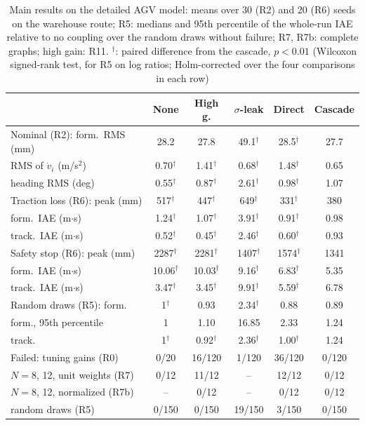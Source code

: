 \begin{table}[t]
\caption{Main results on the detailed AGV model: means over 30 (R2) and 20 (R6) seeds on the warehouse route; R5: medians and 95th percentile of the whole-run IAE relative to no coupling over the random draws without failure; R7, R7b: complete graphs; high gain: R11. $^\dagger$: paired difference from the cascade, $p<0.01$ (Wilcoxon signed-rank test, for R5 on log ratios; Holm-corrected over the four comparisons in each row)}\label{tab:hifi}
\centering\footnotesize
\setlength{\tabcolsep}{2.0pt}
\begin{tabular}{@{}lccccc@{}}
\toprule
 & None & High g. & $\sigma$-leak & Direct & Cascade\\
\midrule
Nominal (R2): form.\ RMS (mm) & 28.2 & 27.8 & 49.1$^\dagger$ & 28.5$^\dagger$ & 27.7\\
\quad RMS of $\dot v_i$ (m/s$^2$) & 0.70$^\dagger$ & 1.41$^\dagger$ & 0.68$^\dagger$ & 1.48$^\dagger$ & 0.65\\
\quad heading RMS (deg) & 0.55$^\dagger$ & 0.87$^\dagger$ & 2.61$^\dagger$ & 0.98$^\dagger$ & 1.07\\
Traction loss (R6): peak (mm) & 517$^\dagger$ & 447$^\dagger$ & 649$^\dagger$ & 331$^\dagger$ & 380\\
\quad form.\ IAE (m$\cdot$s) & 1.24$^\dagger$ & 1.07$^\dagger$ & 3.91$^\dagger$ & 0.91$^\dagger$ & 0.98\\
\quad track.\ IAE (m$\cdot$s) & 0.52$^\dagger$ & 0.45$^\dagger$ & 2.46$^\dagger$ & 0.60$^\dagger$ & 0.93\\
Safety stop (R6): peak (mm) & 2287$^\dagger$ & 2281$^\dagger$ & 1407$^\dagger$ & 1574$^\dagger$ & 1341\\
\quad form.\ IAE (m$\cdot$s) & 10.06$^\dagger$ & 10.03$^\dagger$ & 9.16$^\dagger$ & 6.83$^\dagger$ & 5.35\\
\quad track.\ IAE (m$\cdot$s) & 3.47$^\dagger$ & 3.45$^\dagger$ & 9.91$^\dagger$ & 5.59$^\dagger$ & 6.78\\
Random draws (R5): form. & 1$^\dagger$ & 0.93 & 2.34$^\dagger$ & 0.88 & 0.89\\
\quad form., 95th percentile & 1 & 1.10 & 16.85 & 2.33 & 1.24\\
\quad track. & 1$^\dagger$ & 0.92$^\dagger$ & 2.36$^\dagger$ & 1.00$^\dagger$ & 1.24\\
Failed: tuning gains (R0) & 0/20 & 16/120 & 1/120 & 36/120 & 0/120\\
\quad $N=8$, 12, unit weights (R7) & 0/12 & 11/12 & -- & 12/12 & 0/12\\
\quad $N=8$, 12, normalized (R7b) & -- & 0/12 & -- & 0/12 & 0/12\\
\quad random draws (R5) & 0/150 & 0/150 & 19/150 & 3/150 & 0/150\\
\bottomrule
\end{tabular}
\end{table}
